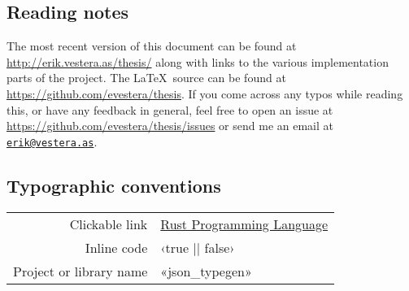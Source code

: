 
\vspace*{2cm}
\thispagestyle{plain}

\begin{center}

\section*{\hfil Reading notes \hfil}

\end{center}

The most recent version of this document can be found at \url{http://erik.vestera.as/thesis/} along with links to the various implementation parts of the project. The \LaTeX\ source can be found at \url{https://github.com/evestera/thesis}. If you come across any typos while reading this, or have any feedback in general, feel free to open an issue at \url{https://github.com/evestera/thesis/issues} or send me an email at \href{mailto:erik@vestera.as}{\nolinkurl{erik@vestera.as}}.

\begin{center}

\subsection*{\hfil Typographic conventions \hfil}

\begin{tabular}{ r l }
Clickable link & \href{https://www.rust-lang.org/}{Rust Programming Language} \\
Inline code & ‹true || false› \\
Project or library name & «json_typegen» \\
\end{tabular}

\end{center}
